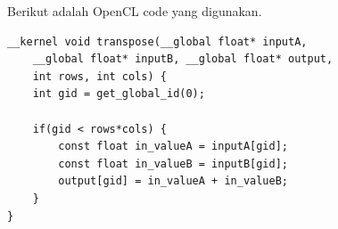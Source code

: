 Berikut adalah OpenCL code yang digunakan.
\begin{lstlisting}[frame=single]
__kernel void transpose(__global float* inputA, 
    __global float* inputB, __global float* output, 
    int rows, int cols) {         
    int gid = get_global_id(0);                                      

    if(gid < rows*cols) {
        const float in_valueA = inputA[gid];
        const float in_valueB = inputB[gid];
        output[gid] = in_valueA + in_valueB;
    }
}
\end{lstlisting}